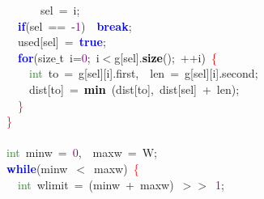 {{\mbox{}\ \ \ \ \ \ \ \ sel\ \textcolor{BrickRed}{=}\ i\textcolor{BrickRed}{;} \\
\mbox{}\ \ \ \ \textbf{\textcolor{Blue}{if}}\textcolor{BrickRed}{(}sel\ \textcolor{BrickRed}{==}\ \textcolor{BrickRed}{-}\textcolor{Purple}{1}\textcolor{BrickRed}{)}\ \ \textbf{\textcolor{Blue}{break}}\textcolor{BrickRed}{;} \\
\mbox{}\ \ \ \ used\textcolor{BrickRed}{[}sel\textcolor{BrickRed}{]}\ \textcolor{BrickRed}{=}\ \textbf{\textcolor{Blue}{true}}\textcolor{BrickRed}{;} \\
\mbox{}\ \ \ \ \textbf{\textcolor{Blue}{for}}\textcolor{BrickRed}{(}\textcolor{TealBlue}{size$\_$t}\ i\textcolor{BrickRed}{=}\textcolor{Purple}{0}\textcolor{BrickRed}{;}\ i\textcolor{BrickRed}{$<$}g\textcolor{BrickRed}{[}sel\textcolor{BrickRed}{].}\textbf{\textcolor{Black}{size}}\textcolor{BrickRed}{();}\ \textcolor{BrickRed}{++}i\textcolor{BrickRed}{)}\ \textcolor{Red}{\{} \\
\mbox{}\ \ \ \ \ \ \textcolor{ForestGreen}{int}\ to\ \textcolor{BrickRed}{=}\ g\textcolor{BrickRed}{[}sel\textcolor{BrickRed}{][}i\textcolor{BrickRed}{].}first\textcolor{BrickRed}{,}\ \ len\ \textcolor{BrickRed}{=}\ g\textcolor{BrickRed}{[}sel\textcolor{BrickRed}{][}i\textcolor{BrickRed}{].}second\textcolor{BrickRed}{;} \\
\mbox{}\ \ \ \ \ \ dist\textcolor{BrickRed}{[}to\textcolor{BrickRed}{]}\ \textcolor{BrickRed}{=}\ \textbf{\textcolor{Black}{min}}\ \textcolor{BrickRed}{(}dist\textcolor{BrickRed}{[}to\textcolor{BrickRed}{],}\ dist\textcolor{BrickRed}{[}sel\textcolor{BrickRed}{]}\ \textcolor{BrickRed}{+}\ len\textcolor{BrickRed}{);} \\
\mbox{}\ \ \ \ \textcolor{Red}{\}} \\
\mbox{}\ \ \textcolor{Red}{\}} \\
\mbox{} \\
\mbox{}\ \ \textcolor{ForestGreen}{int}\ minw\ \textcolor{BrickRed}{=}\ \textcolor{Purple}{0}\textcolor{BrickRed}{,}\ \ maxw\ \textcolor{BrickRed}{=}\ W\textcolor{BrickRed}{;} \\
\mbox{}\ \ \textbf{\textcolor{Blue}{while}}\textcolor{BrickRed}{(}minw\ \textcolor{BrickRed}{$<$}\ maxw\textcolor{BrickRed}{)}\ \textcolor{Red}{\{} \\
\mbox{}\ \ \ \ \textcolor{ForestGreen}{int}\ wlimit\ \textcolor{BrickRed}{=}\ \textcolor{BrickRed}{(}minw\ \textcolor{BrickRed}{+}\ maxw\textcolor{BrickRed}{)}\ \textcolor{BrickRed}{$>$$>$}\ \textcolor{Purple}{1}\textcolor{BrickRed}{;} \\
}}
